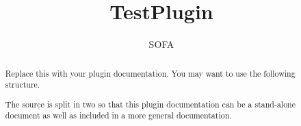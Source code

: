 \documentclass{article}
\begin{document}
\raggedright

\title{TestPlugin}
\author{SOFA}

\maketitle

\begin{abstract}
Replace this with your plugin documentation. You may want to use the following structure.

The source is split in two so that this plugin documentation can be a stand-alone document as well as included in a more general documentation.
\end{abstract}


\end{document}
